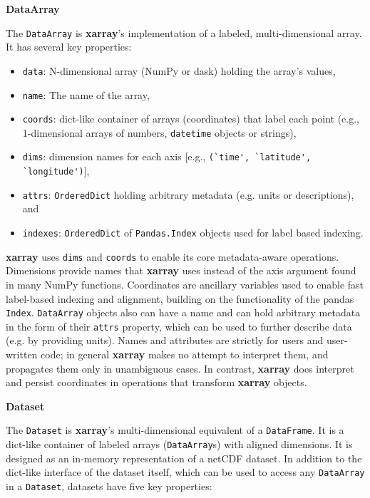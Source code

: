 \documentclass{jors}
\begin{document}
\textbf{DataArray}

The \verb|DataArray| is \textbf{xarray}'s implementation of a labeled, multi-dimensional array. It has several key properties:

\begin{itemize}
	\item \verb|data|: N-dimensional array (NumPy or dask) holding the array's values,
	\item \verb|name|: The name of the array,
	\item \verb|coords|: dict-like container of arrays (coordinates) that label each point (e.g., 1-dimensional arrays of numbers, \verb|datetime| objects or strings),
	\item \verb|dims|: dimension names for each axis [e.g., \verb|(`time', `latitude', `longitude')|],
	\item \verb|attrs|: \verb|OrderedDict| holding arbitrary metadata (e.g. units or descriptions), and
	\item \verb|indexes|: \verb|OrderedDict| of \verb|Pandas.Index| objects used for label based indexing.
\end{itemize}

\textbf{xarray} uses \verb|dims| and \verb|coords| to enable its core metadata-aware operations.
Dimensions provide names that \textbf{xarray} uses instead of the axis argument found in many NumPy functions.
Coordinates are ancillary variables used to enable fast label-based indexing and alignment, building on the functionality of the pandas \verb|Index|.
\verb|DataArray| objects also can have a name and can hold arbitrary metadata in the form of their \verb|attrs| property, which can be used to further describe data (e.g. by providing units).
Names and attributes are strictly for users and user-written code; in general \textbf{xarray} makes no attempt to interpret them, and propagates them only in unambiguous cases.
In contrast, \textbf{xarray} does interpret and persist coordinates in operations that transform \textbf{xarray} objects.

\textbf{Dataset}

The \verb|Dataset| is \textbf{xarray}'s multi-dimensional equivalent of a \verb|DataFrame|.
It is a dict-like container of labeled arrays (\verb|DataArray|s) with aligned dimensions.
It is designed as an in-memory representation of a netCDF dataset.
In addition to the dict-like interface of the dataset itself, which can be used to access any \verb|DataArray| in a \verb|Dataset|, datasets have five key properties:
\end{document}
